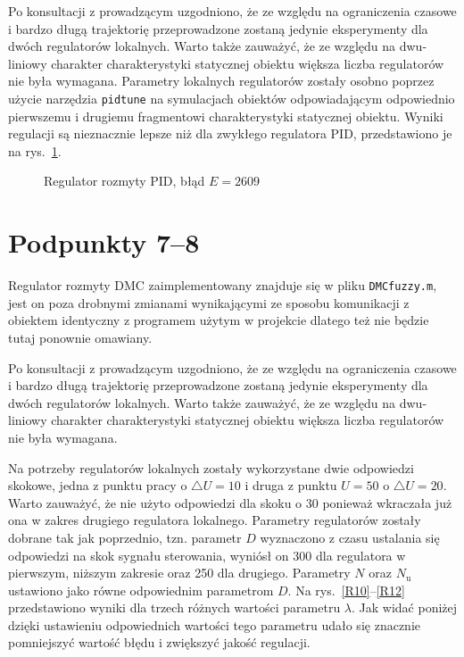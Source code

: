 Po konsultacji z prowadzącym uzgodniono, że ze względu na ograniczenia czasowe i bardzo długą trajektorię przeprowadzone zostaną jedynie eksperymenty dla dwóch regulatorów lokalnych. Warto także zauważyć, że ze względu na dwu-liniowy charakter charakterystyki statycznej obiektu większa liczba regulatorów nie była wymagana. Parametry lokalnych regulatorów zostały osobno poprzez użycie narzędzia \verb+pidtune+ na symulacjach obiektów odpowiadającym odpowiednio pierwszemu i drugiemu fragmentowi charakterystyki statycznej obiektu. Wyniki regulacji są nieznacznie lepsze niż dla zwykłego regulatora PID, przedstawiono je na rys.~\ref{R9}.

\begin{figure}[H]
\centering

\caption{Regulator rozmyty PID, błąd $E=2609$}
\label{R9}
\end{figure}

\chapter{Podpunkty 7--8}
Regulator rozmyty DMC zaimplementowany znajduje się w pliku \verb+DMCfuzzy.m+, jest on poza drobnymi zmianami wynikającymi ze sposobu komunikacji z obiektem identyczny z programem użytym w projekcie dlatego też nie będzie tutaj ponownie omawiany.

Po konsultacji z prowadzącym uzgodniono, że ze względu na ograniczenia czasowe i bardzo długą trajektorię przeprowadzone zostaną jedynie eksperymenty dla dwóch regulatorów lokalnych. Warto także zauważyć, że ze względu na dwu-liniowy charakter charakterystyki statycznej obiektu większa liczba regulatorów nie była wymagana.

Na potrzeby regulatorów lokalnych zostały wykorzystane dwie odpowiedzi skokowe, jedna z punktu pracy o $\triangle U = 10$ i druga z punktu $U=50$ o $\triangle U = 20$. Warto zauważyć, że nie użyto odpowiedzi dla skoku o 30 ponieważ wkraczała już ona w zakres drugiego regulatora lokalnego. Parametry regulatorów zostały dobrane tak jak poprzednio, tzn. parametr $D$ wyznaczono z czasu ustalania się odpowiedzi na skok sygnału sterowania, wyniósł on 300 dla regulatora w pierwszym, niższym zakresie oraz 250 dla drugiego. Parametry $N$ oraz $N_\mathrm{u}$ ustawiono jako równe odpowiednim parametrom $D$. Na rys.~\ref{R10}--\ref{R12} przedstawiono wyniki dla trzech różnych wartości parametru $\lambda$. Jak widać poniżej dzięki ustawieniu odpowiednich wartości tego parametru udało się znacznie pomniejszyć wartość błędu i zwiększyć jakość regulacji.

